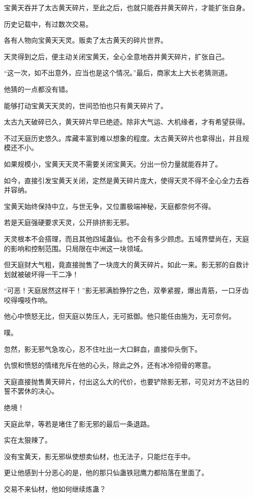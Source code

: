 \begin{this_body}
宝黄天吞并了太古黄天碎片，至此之后，也就只能吞并黄天碎片，才能扩张自身。

历史记载中，有过数次交易。

各有人物向宝黄天天灵。贩卖了太古黄天的碎片世界。

天灵得到之后，便主动关闭宝黄天，全心全意地吞并黄天碎片，扩张自己。

“这一次，如不出意外，应当也是这个情况。”最后，商家太上大长老猜测道。

他猜的一点都没有错。

能够打动宝黄天天灵的，世间恐怕也只有黄天碎片了。

太古九天破碎已久，黄天碎片早已绝迹。除非大气运、大机缘者，才有希望获得。

不过天庭历史悠久。库藏丰富到难以想象的程度。太古黄天碎片也拿得出，并且规模还不小。

如果规模小，宝黄天天灵不需要关闭宝黄天。分出一份力量就能吞并了。

如今，直接引发宝黄天关闭，定然是黄天碎片庞大，使得天灵不得不全心全力去吞并容纳。

宝黄天始终保持中立，与世无争，又位置极端神秘，天庭都奈何不得。

若是天庭强硬要求天灵，公开排挤影无邪。

天灵根本不会搭理，而且其他四域蛊仙。也不会有多少顾虑。五域界壁尚在，天庭的影响和控制范围。只局限在中洲这一块领域。

但天庭财大气粗，竟直接抛售了一块庞大的黄天碎片。如此一来。影无邪的自救计划就被破坏得一干二净！

“可恶！天庭居然这样干！”影无邪满脸狰狞之色，双拳紧握，爆出青筋，一口牙齿咬得嘎吱作响。

他心中愤怒无比，但天庭以势压人，无可抵御。他只能任由施为，无可奈何。

噗。

忽然，影无邪气急攻心，忍不住吐出一大口鲜血，直接仰头倒下。

仇恨和愤怒的情绪充斥在他的心头，除此之外，还有冰冷彻骨的寒意。

天庭直接抛售黄天碎片，付出这么大的代价，也要铲除影无邪，可见对方不达目的誓不罢休的决心。

绝境！

天庭此举，等若是堵住了影无邪的最后一条退路。

实在太狠辣了。

没有宝黄天，影无邪纵使想卖仙材，也无法子，只能烂在手中。

更让他感到十分恶心的是，他的那只仙蛊铁冠鹰力都陷落在里面了。

交易不来仙材，他如何继续炼蛊？


\end{this_body}
